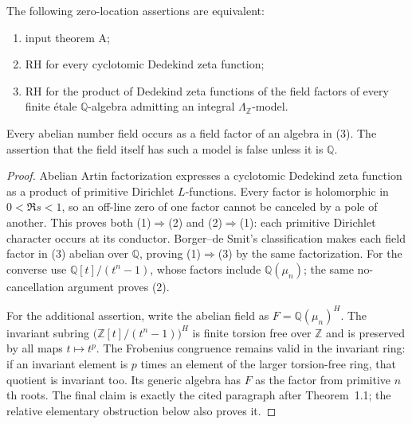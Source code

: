 \begin{proposition}
\label{AC-K01}
The following zero-location assertions are equivalent:
\begin{enumerate}
\item input theorem A;
\item RH for every cyclotomic Dedekind zeta function;
\item RH for the product of Dedekind zeta functions of the field
factors of every finite \'etale $\mathbb Q$-algebra admitting an
integral $\Lambda_{\mathbb Z}$-model.
\end{enumerate}
Every abelian number field occurs as a field factor of an algebra
in (3). The assertion that the field itself has such a model is
false unless it is $\mathbb Q$.
\end{proposition}
\begin{proof}
Abelian Artin factorization expresses a cyclotomic Dedekind zeta
function as a product of primitive Dirichlet $L$-functions.
Every factor is holomorphic in $0<\Re s<1$, so an off-line zero
of one factor cannot be canceled by a pole of another. This proves
both (1)$\Rightarrow$(2) and (2)$\Rightarrow$(1): each primitive
Dirichlet character occurs at its conductor. Borger--de Smit's
classification makes each field factor in (3) abelian over
$\mathbb Q$, proving (1)$\Rightarrow$(3) by the same factorization.
For the converse use $\mathbb Q[t]/(t^n-1)$, whose factors include
$\mathbb Q(\mu_n)$; the same no-cancellation argument proves (2).

For the additional assertion, write the abelian field as
$F=\mathbb Q(\mu_n)^H$. The invariant subring
$\bigl(\mathbb Z[t]/(t^n-1)\bigr)^H$ is finite torsion free over
$\mathbb Z$ and is preserved by all maps $t\mapsto t^p$.
The Frobenius congruence remains valid in the invariant ring:
if an invariant element is $p$ times an element of the larger
torsion-free ring, that quotient is invariant too. Its generic
algebra has $F$ as the factor from primitive $n$th roots. The final
claim is exactly the cited paragraph after Theorem~1.1; the
relative elementary obstruction below also proves it.
\end{proof}

